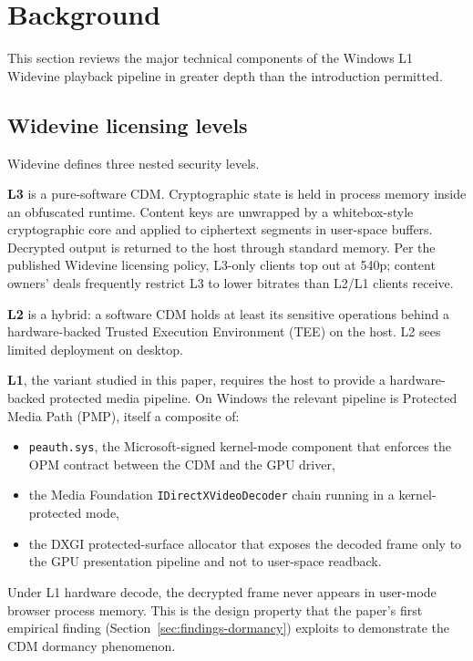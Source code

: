 \documentclass[11pt,letterpaper]{article}
\let\oldsection\section
\renewcommand{\section}{\clearpage\oldsection}
\begin{document}
\section{Background}
\label{sec:background}

This section reviews the major technical components of the
Windows L1 Widevine playback pipeline in greater depth than the
introduction permitted.

\subsection{Widevine licensing levels}
\label{sec:bg-levels}

Widevine defines three nested security levels.

\textbf{L3} is a pure-software CDM. Cryptographic state is held in
process memory inside an obfuscated runtime. Content keys are
unwrapped by a whitebox-style cryptographic core and applied to
ciphertext segments in user-space buffers. Decrypted output is
returned to the host through standard memory. Per the published
Widevine licensing policy, L3-only clients top out at 540p; content
owners' deals frequently restrict L3 to lower bitrates than L2/L1
clients receive.

\textbf{L2} is a hybrid: a software CDM holds at least its
sensitive operations behind a hardware-backed Trusted Execution
Environment (TEE) on the host. L2 sees limited deployment on
desktop.

\textbf{L1}, the variant studied in this paper, requires the host
to provide a hardware-backed protected media pipeline. On Windows
the relevant pipeline is Protected Media Path (PMP), itself a
composite of:

\begin{itemize}[itemsep=0pt,topsep=2pt]
  \item \texttt{peauth.sys}, the Microsoft-signed kernel-mode
        component that enforces the OPM contract between the CDM
        and the GPU driver,
  \item the Media Foundation \texttt{IDirectXVideoDecoder} chain
        running in a kernel-protected mode,
  \item the DXGI protected-surface allocator that exposes the
        decoded frame only to the GPU presentation pipeline and not
        to user-space readback.
\end{itemize}

Under L1 hardware decode, the decrypted frame never appears in
user-mode browser process memory. This is the design property that
the paper's first empirical finding (Section~\ref{sec:findings-dormancy})
exploits to demonstrate the CDM dormancy phenomenon.
\end{document}

